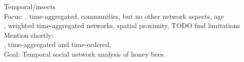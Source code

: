 Temporal/insects\\
Focus: \textcite{mersch2013tracking}, time-aggregated, communities, but no other network aspects, age\\
\textcite{jeanson2012long}, weighted time-aggregated networks, spatial proximity, TODO find limitations\\
Mention shortly:\\
\textcite{blonder2011time}, time-aggregated and time-ordered,\\




Goal: Temporal social network analysis of honey bees.